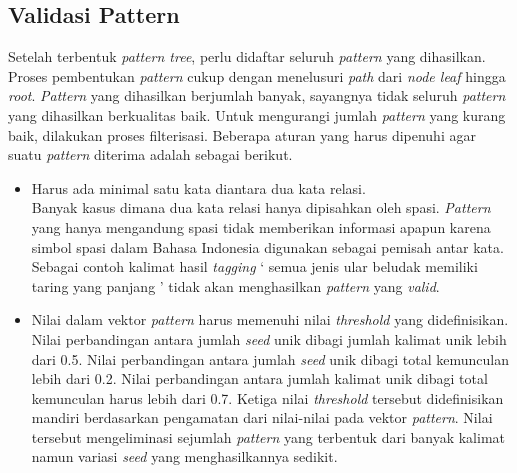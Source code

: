 \subsection{Validasi Pattern}
Setelah terbentuk \textit{pattern tree}, perlu didaftar seluruh \textit{pattern} yang dihasilkan. Proses pembentukan \textit{pattern} cukup dengan menelusuri \textit{path} dari \textit{node leaf} hingga \textit{root}. \textit{Pattern} yang dihasilkan berjumlah banyak, sayangnya tidak seluruh \textit{pattern} yang dihasilkan berkualitas baik. Untuk mengurangi jumlah \textit{pattern} yang kurang baik, dilakukan proses filterisasi. Beberapa aturan yang harus dipenuhi agar suatu \textit{pattern} diterima adalah sebagai berikut.

\begin{itemize}
  \item Harus ada minimal satu kata diantara dua kata relasi. \\
  Banyak kasus dimana dua kata relasi hanya dipisahkan oleh spasi. \textit{Pattern} yang hanya mengandung spasi tidak memberikan informasi apapun karena simbol spasi dalam Bahasa Indonesia digunakan sebagai pemisah antar kata. Sebagai contoh kalimat hasil \textit{tagging} `{\tagStart} semua jenis {\tagHypernym}ular{\tagHypernym} {\tagHyponym}beludak{\tagHyponym} memiliki taring yang panjang {\tagEnd}' tidak akan menghasilkan \textit{pattern} yang \textit{valid}.
  \item Nilai dalam vektor \textit{pattern} harus memenuhi nilai \textit{threshold} yang didefinisikan. \\
  Nilai perbandingan antara jumlah \textit{seed} unik dibagi jumlah kalimat unik lebih dari 0.5. Nilai perbandingan antara jumlah \textit{seed} unik dibagi total kemunculan lebih dari 0.2. Nilai perbandingan antara jumlah kalimat unik dibagi total kemunculan harus lebih dari 0.7. Ketiga nilai \textit{threshold} tersebut didefinisikan mandiri berdasarkan pengamatan dari nilai-nilai pada vektor \textit{pattern}. Nilai tersebut mengeliminasi sejumlah \textit{pattern} yang terbentuk dari banyak kalimat namun variasi \textit{seed} yang menghasilkannya sedikit.
\end{itemize}

